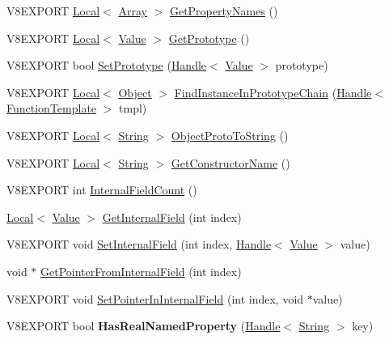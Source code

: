 \begin{DoxyCompactItemize}
\item 
V8\+E\+X\+P\+O\+R\+T \hyperlink{classv8_1_1_local}{Local}$<$ \hyperlink{classv8_1_1_array}{Array} $>$ \hyperlink{classv8_1_1_object_a0e28660353b6da64f9e2769260f31001}{Get\+Property\+Names} ()
\item 
V8\+E\+X\+P\+O\+R\+T \hyperlink{classv8_1_1_local}{Local}$<$ \hyperlink{classv8_1_1_value}{Value} $>$ \hyperlink{classv8_1_1_object_a171fc92c6e695d9c944f9e5d7670ed11}{Get\+Prototype} ()
\item 
V8\+E\+X\+P\+O\+R\+T bool \hyperlink{classv8_1_1_object_a2a1ab58bf92984255f767946eeff1199}{Set\+Prototype} (\hyperlink{classv8_1_1_handle}{Handle}$<$ \hyperlink{classv8_1_1_value}{Value} $>$ prototype)
\item 
V8\+E\+X\+P\+O\+R\+T \hyperlink{classv8_1_1_local}{Local}$<$ \hyperlink{classv8_1_1_object}{Object} $>$ \hyperlink{classv8_1_1_object_aa3b8aaece354c6af98b98e0ae9abe13d}{Find\+Instance\+In\+Prototype\+Chain} (\hyperlink{classv8_1_1_handle}{Handle}$<$ \hyperlink{classv8_1_1_function_template}{Function\+Template} $>$ tmpl)
\item 
V8\+E\+X\+P\+O\+R\+T \hyperlink{classv8_1_1_local}{Local}$<$ \hyperlink{classv8_1_1_string}{String} $>$ \hyperlink{classv8_1_1_object_a2dc22d2a2acf9eab4ed2965149e48af9}{Object\+Proto\+To\+String} ()
\item 
V8\+E\+X\+P\+O\+R\+T \hyperlink{classv8_1_1_local}{Local}$<$ \hyperlink{classv8_1_1_string}{String} $>$ \hyperlink{classv8_1_1_object_a4851a914d3d95b5eb7238c664fb7fd16}{Get\+Constructor\+Name} ()
\item 
V8\+E\+X\+P\+O\+R\+T int \hyperlink{classv8_1_1_object_affaee480d3f50d5ac7a640db5aa8e89d}{Internal\+Field\+Count} ()
\item 
\hyperlink{classv8_1_1_local}{Local}$<$ \hyperlink{classv8_1_1_value}{Value} $>$ \hyperlink{classv8_1_1_object_aa3324fdf652d8ac3b2f27faa0559231d}{Get\+Internal\+Field} (int index)
\item 
V8\+E\+X\+P\+O\+R\+T void \hyperlink{classv8_1_1_object_a94e24494687ea499471d41e914eeb90d}{Set\+Internal\+Field} (int index, \hyperlink{classv8_1_1_handle}{Handle}$<$ \hyperlink{classv8_1_1_value}{Value} $>$ value)
\item 
void $\ast$ \hyperlink{classv8_1_1_object_a8ef1f3e0d4f4cecc54d5e0248bc45694}{Get\+Pointer\+From\+Internal\+Field} (int index)
\item 
V8\+E\+X\+P\+O\+R\+T void \hyperlink{classv8_1_1_object_a5e79966b79d69ef3a7b3b0d91414ec2c}{Set\+Pointer\+In\+Internal\+Field} (int index, void $\ast$value)
\item 
\hypertarget{classv8_1_1_object_ad5f2524b42102c4feb63fe5e17eaec83}{}V8\+E\+X\+P\+O\+R\+T bool {\bfseries Has\+Real\+Named\+Property} (\hyperlink{classv8_1_1_handle}{Handle}$<$ \hyperlink{classv8_1_1_string}{String} $>$ key)\label{classv8_1_1_object_ad5f2524b42102c4feb63fe5e17eaec83}


\end{DoxyCompactItemize}
